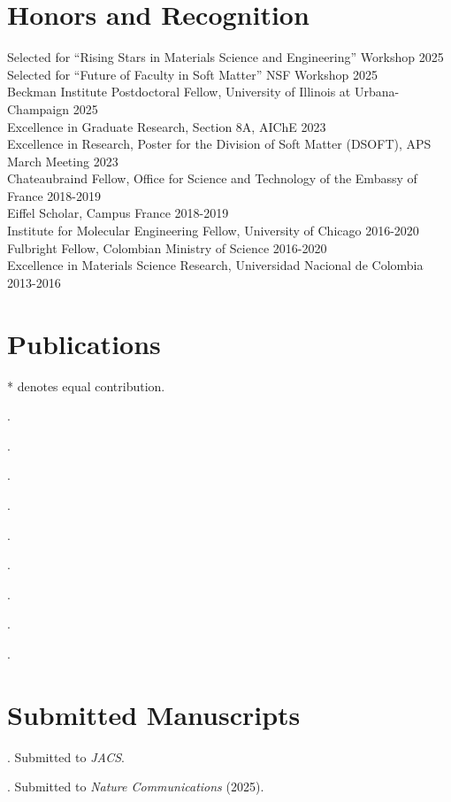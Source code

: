 \documentclass[10pt, singlespace]{article}
\begin{document}
\section{Honors and Recognition}
Selected for ``Rising Stars in Materials Science and Engineering'' Workshop \hfill 2025 \\
Selected for ``Future of Faculty in Soft Matter'' NSF Workshop \hfill 2025 \\
Beckman Institute Postdoctoral Fellow, University of Illinois at Urbana-Champaign \hfill 2025\\
Excellence in Graduate Research, Section 8A, AIChE \hfill 2023 \\
Excellence in Research, Poster for the Division of Soft Matter (DSOFT), APS March Meeting \hfill 2023 \\
Chateaubraind Fellow, Office for Science and Technology of the Embassy of France \hfill 2018-2019\\
Eiffel Scholar, Campus France \hfill 2018-2019\\
Institute for Molecular Engineering Fellow, University of Chicago \hfill 2016-2020 \\
Fulbright Fellow, Colombian Ministry of Science \hfill 2016-2020\\
Excellence in Materials Science Research, Universidad Nacional de Colombia \hfill 2013-2016 

\section{Publications}
{* denotes equal contribution.}
\begin{bibenum*}
    
    \item {}.
    \item {}.
    \item {}.
    \item {}.
    \item {}.
    \item {}.
    \item {}.
    \item {}.
    \item {}.
\end{bibenum*}

\section{Submitted Manuscripts}
\begin{bibenum*}
    \item {}. Submitted to \textit{JACS}.
    \item {}. Submitted to \textit{Nature Communications} (2025).
\end{bibenum*}
\end{document}
